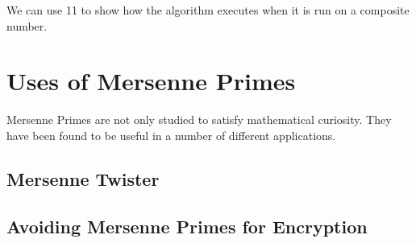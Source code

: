 We can use 11 to show how the algorithm executes when it is run on a composite number.


\section{Uses of Mersenne Primes}

Mersenne Primes are not only studied to satisfy mathematical curiosity.  They have been found to be useful in a number of different applications.  

\subsection{Mersenne Twister}

\subsection{Avoiding Mersenne Primes for Encryption}

